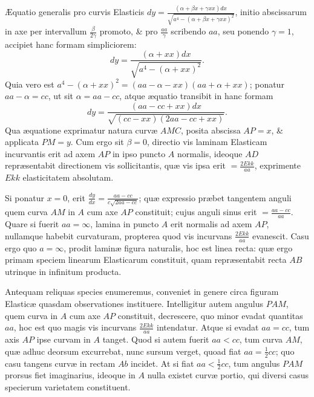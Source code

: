 Æquatio generalis pro curvis Elasticis $dy=\frac{(\alpha+\beta x+\gamma xx)dx}{\sqrt{a^4-(\alpha+\beta x+\gamma xx)^2}}$, initio abscissarum in axe per intervallum $\frac\beta{2\gamma}$ promoto, \& pro $\frac{aa}\gamma$ scribendo $aa$, seu ponendo $\gamma=1$, accipiet hanc formam simpliciorem:
\[dy=\frac{(\alpha+xx)dx}{\sqrt{a^4-(\alpha+xx)^2}}.\]
Quia vero est $a^4-(\alpha+xx)^2=(aa-\alpha-xx)(aa+\alpha+xx)$; ponatur $aa-\alpha=cc$, ut sit $\alpha=aa-cc$, atque æquatio transibit in hanc formam
\[dy=\frac{(aa-cc+xx)dx}{\sqrt{(cc-xx)(2aa-cc+xx)}}.\]
Qua æquatione exprimatur natura curvæ $AMC$, posita abscissa $AP=x$, \& applicata $PM=y$. Cum ergo sit $\beta=0$, directio vis laminam Elasticam incurvantis erit ad axem $AP$ in ipso puncto $A$ normalis, ideoque $AD$ repræsentabit directionem vis sollicitantis, quæ vis ipsa erit $=\frac{2Ekk}{aa}$, exprimente $Ekk$ elasticitatem absolutam.

Si ponatur $x=0$, erit $\frac{dy}{dx}=\frac{aa-cc}{c\sqrt{2aa-cc}}$; quæ expressio præbet tangentem anguli quem curva $AM$ in $A$ cum axe $AP$ constituit; cujus anguli sinus erit $=\frac{aa-cc}{aa}$. Quare si fuerit $aa=\infty$, lamina in puncto $A$ erit normalis ad axem $AP$, nullamque habebit curvaturam, propterea quod vis incurvans $\frac{2Ekk}{aa}$ evanescit. Casu ergo quo $a=\infty$, prodit laminæ figura naturalis, hoc est linea recta: quæ ergo primam speciem linearum Elasticarum constituit, quam repræsentabit recta $AB$ utrinque in infinitum producta.

Antequam reliquas species enumeremus, conveniet in genere circa figuram Elasticæ quasdam observationes instituere. Intelligitur autem angulus $PAM$, quem curva in $A$ cum axe $AP$ constituit, decrescere, quo minor evadat quantitas $aa$, hoc est quo magis vis incurvans $\frac{2Ekk}{aa}$ intendatur. Atque si evadat $aa=cc$, tum axis $AP$ ipse curvam in $A$ tanget. Quod si autem fuerit $aa<cc$, tum curva $AM$, quæ adhuc deorsum excurrebat, nunc sursum verget, quoad fiat $aa=\frac12cc$; quo casu tangens
curvæ in rectam $Ab$ incidet. At si fiat $aa<\frac12cc$, tum angulus $PAM$ prorsus fiet imaginarius, ideoque in $A$ nulla existet curvæ portio, qui diversi casus specierum varietatem constituent.

